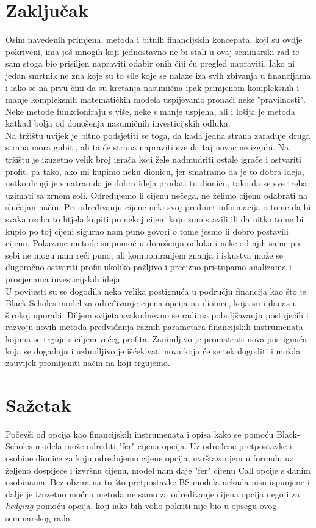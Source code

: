 \documentclass[times, utf8, seminar]{fer}
\begin{document}
\chapter{Zaključak}
Osim navedenih primjena, metoda i bitnih financijskih koncepata, koji su ovdje pokriveni, ima još mnogih koji jednostavno ne bi stali u ovaj seminarski rad te sam stoga bio prisiljen napraviti odabir onih čiji ću pregled napraviti. Iako ni jedan smrtnik ne zna koje su to sile koje se nalaze iza svih zbivanja u financijama i iako se na prvu čini da su kretanja nasumična ipak primjenom kompleksnih i manje kompleksnih matematičkih modela uspijevamo pronaći neke "pravilnosti". Neke metode funkcioniraju s više, neke s manje uspjeha, ali i lošija je metoda katkad bolja od donošenja nasumičnih investicijskih odluka.\\
Na tržištu uvijek je bitno podsjetiti se toga, da kada jedna strana zarađuje druga strana mora gubiti, ali ta će strana napraviti sve da taj novac ne izgubi. Na tržištu je izuzetno velik broj igrača koji žele nadmudriti ostale igrače i ostvariti profit, pa tako, ako mi kupimo neku dionicu, jer smatramo da je to dobra ideja, netko drugi je smatrao da je dobra ideja prodati tu dionicu, tako da se sve treba uzimati sa zrnom soli. Određujemo li cijenu nečega, ne želimo cijenu odabrati na slučajan način. Pri određivanju cijene neki svoj predmet informacija o tome da bi svaka osoba to htjela kupiti po nekoj cijeni koju smo stavili ili da nitko to ne bi kupio po toj cijeni sigurno nam puno govori o tome jesmo li dobro postavili cijenu. Pokazane metode su pomoć u donošenju odluka i neke od njih same po sebi ne mogu nam reći puno, ali komponiranjem znanja i iskustva može se dugoročno ostvariti profit ukoliko pažljivo i precizno pristupamo analizama i procjenama investicijskih ideja. \\
U povijesti su se dogodila neka velika postignuća u području financija kao što je Black-Scholes model za određivanje cijena opcija na dioince, koja su i danas u širokoj uporabi. Diljem svijeta svakodnevno se radi na poboljšavanju postojećih i razvoju novih metoda predviđanja raznih parametara financijskih instrumenata kojima se trguje s ciljem većeg profita. Zanimljivo je promatrati nova postignuća koja se događaju i uzbudljivo je išćekivati nova koja će se tek dogoditi i možda zauvijek promijeniti način na koji trgujemo.




\chapter{Sažetak}
Počevši od opcija kao financijskih instrumenata i opisa kako se pomoću Black-Scholes modela može odrediti "fer" cijena opcija. Uz određene pretpostavke i osobine dionice za koju određujemo cijene opcija, uvrštavanjem u formulu uz željeno dospijeće i izvršnu cijenu, model nam daje "fer" cijenu Call opcije s danim osobinama. Bez obzira na to što pretpostavke BS modela nekada nisu ispunjene i dalje je izuzetno moćna metoda ne samo za određivanje cijena opcija nego i za \textit{hedging} pomoću opcija, koji iako bih volio pokriti nije bio u opsegu ovog seminarskog rada.
\end{document}
